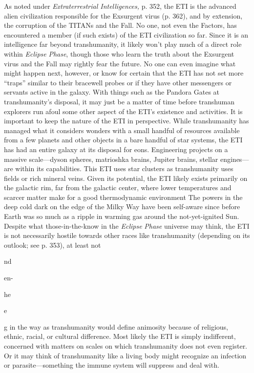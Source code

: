 As noted under \textit{Extraterrestrial Intelligences,} p. 352, 
the ETI is the advanced alien civilization responsible 
for the Exsurgent virus (p. 362), and by extension, 
the corruption of the TITANs and the Fall.
No one, not even the Factors, has encountered a 
member (if such exists) of the ETI civilization so far. 
Since it is an intelligence far beyond transhumanity, it 
likely won't play much of a direct role within \textit{Eclipse }
\textit{Phase}, though those who learn the truth about the 
Exsurgent virus and the Fall may rightly fear the 
future. No one can even imagine what might happen 
next, however, or know for certain that the ETI has 
not set more ``traps'' similar to their bracewell probes 
or if they have other messengers or servants active in 
the galaxy. With things such as the Pandora Gates 
at transhumanity's disposal, it may just be a matter 
of time before transhuman explorers run afoul some 
other aspect of the ETI's existence and activities.
It is important to keep the nature of the ETI in 
perspective. While transhumanity has managed 
what it considers wonders with a small handful of 
resources available from a few planets and other 
objects in a bare handful of star systems, the ETI 
has had an entire galaxy at its disposal for eons. 
Engineering projects on a massive scale—dyson 
spheres, matrioshka brains, Jupiter brains, stellar 
engines—are within its capabilities. This ETI uses 
star clusters as transhumanity uses fields or rich 
mineral veins. Given its potential, the ETI likely 
exists primarily on the galactic rim, far from the 
galactic center, where lower temperatures and 
scarcer matter make for a good thermodynamic environment
The powers in the deep cold dark on the
edge of the Milky Way have been self-aware since 
before Earth was so much as a ripple in warming 
gas around the not-yet-ignited Sun. 
Despite what those-in-the-know in the \textit{Eclipse }
\textit{Phase} universe may think, the ETI is not necessarily
hostile towards other races like transhumanity
(depending on its outlook; see p. 353), at least not 

nd

en-

he

e

g 
in the way as transhumanity would define animosity
because of religious, ethnic, racial, or cultural
difference. Most likely the ETI is simply indifferent, 
concerned with matters on scales on which transhumanity
does not even register. Or it may think of
transhumanity like a living body might recognize an 
infection or parasite—something the immune system 
will suppress and deal with.

